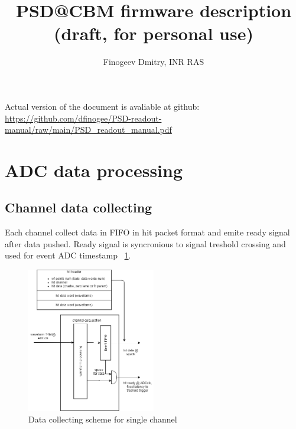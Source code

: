 \documentclass{article}
\title{PSD@CBM firmware description (draft, for personal use)}
\author{Finogeev Dmitry, INR RAS}
\begin{document}
\maketitle

Actual version of the document is avaliable at github:
\newline
\url{https://github.com/dfinogee/PSD-readout-manual/raw/main/PSD_readout_manual.pdf}



\tableofcontents

\newpage

\section{ADC data processing}

\subsection{Channel data collecting}
Each channel collect data in FIFO in hit packet format and emite ready signal after data pushed. Ready signal is syncronious to signal treshold crossing and used for event ADC timestamp ~\ref{fig:1}.


\begin{figure}[H]
	\centering 
	\includegraphics[width=0.5\textwidth]{ADC_event_collection.png}
	\caption{\label{fig:1} Data collecting scheme for single channel}
\end{figure}
\end{document}
